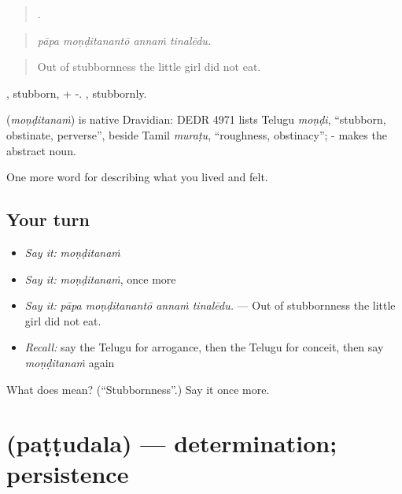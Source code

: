 \begin{quote}
   .
\end{quote}

\begin{quote}
\emph{pāpa moṇḍitanantō annaṁ tinalēdu.}
\end{quote}

\begin{quote}
Out of stubbornness the little girl did not eat.
\end{quote}

, stubborn, + -. , stubbornly.

\begin{cousinweb}
\textbf{} (\emph{moṇḍitanaṁ}) is native Dravidian: DEDR 4971 lists Telugu \emph{moṇḍi}, \textquotedblleft{}stubborn, obstinate, perverse\textquotedblright{}, beside Tamil \emph{muraṭu}, \textquotedblleft{}roughness, obstinacy\textquotedblright{}; - makes the abstract noun.
\end{cousinweb}

\begin{grammarlens}[title={What you've built}]
One more word for describing what you lived and felt.
\end{grammarlens}

\subsection*{Your turn}
\begin{itemize}
\raggedright
  \item \emph{Say it:} \emph{moṇḍitanaṁ}
  \item \emph{Say it:} \emph{moṇḍitanaṁ}, once more
  \item \emph{Say it:} \emph{pāpa moṇḍitanantō annaṁ tinalēdu.} — Out of stubbornness the little girl did not eat.
  \item \emph{Recall:} say the Telugu for arrogance, then the Telugu for conceit, then say \emph{moṇḍitanaṁ} again
\end{itemize}

\begin{tcolorbox}[breakable,colback=teal!4,colframe=teal!35!black,title={Before you move on}]
What does  mean? (\textquotedblleft{}Stubbornness\textquotedblright{}.) Say it once more.
\end{tcolorbox}
\section[\texorpdfstring{\te{పట్టుదల} (paṭṭudala)}{పట్టుదల (paṭṭudala)}]{ (paṭṭudala) — determination; persistence}

